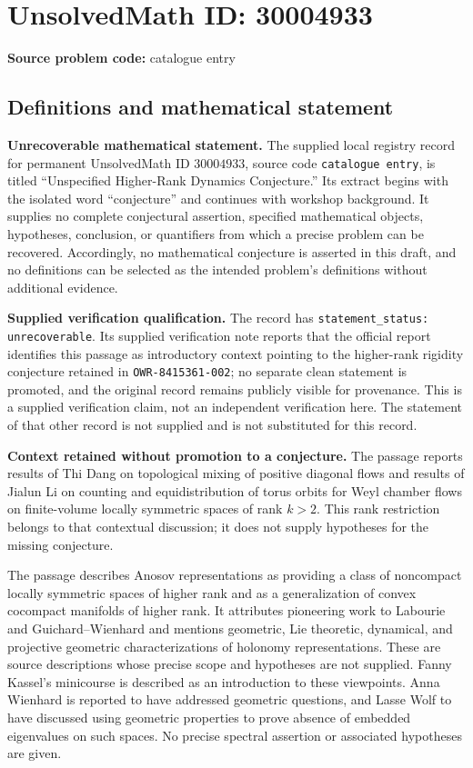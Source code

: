 \documentclass[11pt]{article}
\begin{document}
\section*{UnsolvedMath ID: 30004933}
\textbf{Source problem code:} catalogue entry
\subsection{Definitions and mathematical statement}
\textbf{Unrecoverable mathematical statement.} The supplied local registry record for permanent UnsolvedMath ID \(30004933\), source code \texttt{catalogue entry}, is titled ``Unspecified Higher-Rank Dynamics Conjecture.'' Its extract begins with the isolated word ``conjecture'' and continues with workshop background. It supplies no complete conjectural assertion, specified mathematical objects, hypotheses, conclusion, or quantifiers from which a precise problem can be recovered. Accordingly, no mathematical conjecture is asserted in this draft, and no definitions can be selected as the intended problem's definitions without additional evidence.

\textbf{Supplied verification qualification.} The record has \texttt{statement\_status: unrecoverable}. Its supplied verification note reports that the official report identifies this passage as introductory context pointing to the higher-rank rigidity conjecture retained in \texttt{OWR-8415361-002}; no separate clean statement is promoted, and the original record remains publicly visible for provenance. This is a supplied verification claim, not an independent verification here. The statement of that other record is not supplied and is not substituted for this record.

\textbf{Context retained without promotion to a conjecture.} The passage reports results of Thi Dang on topological mixing of positive diagonal flows and results of Jialun Li on counting and equidistribution of torus orbits for Weyl chamber flows on finite-volume locally symmetric spaces of rank \(k>2\). This rank restriction belongs to that contextual discussion; it does not supply hypotheses for the missing conjecture.

The passage describes Anosov representations as providing a class of noncompact locally symmetric spaces of higher rank and as a generalization of convex cocompact manifolds of higher rank. It attributes pioneering work to Labourie and Guichard--Wienhard and mentions geometric, Lie theoretic, dynamical, and projective geometric characterizations of holonomy representations. These are source descriptions whose precise scope and hypotheses are not supplied. Fanny Kassel's minicourse is described as an introduction to these viewpoints. Anna Wienhard is reported to have addressed geometric questions, and Lasse Wolf to have discussed using geometric properties to prove absence of embedded eigenvalues on such spaces. No precise spectral assertion or associated hypotheses are given.
\end{document}
